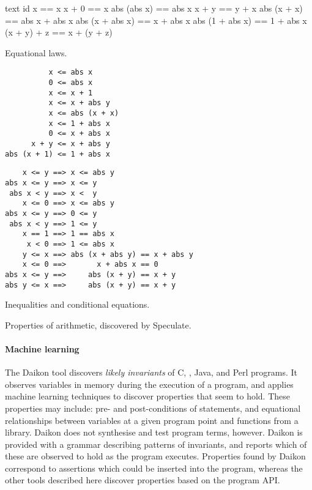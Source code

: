 \begin{listing}
\begin{sublisting}{\textwidth}
\centering
\begin{cminted}{text}
           id x == x
          x + 0 == x
    abs (abs x) == abs x
          x + y == y + x
    abs (x + x) == abs x + abs x
abs (x + abs x) == x + abs x
abs (1 + abs x) == 1 + abs x
    (x + y) + z == x + (y + z)
\end{cminted}
\caption{Equational laws.}\label{lst:arith_props0}
\end{sublisting}

\vspace{1.5em}

\begin{sublisting}{\textwidth}
\begin{minipage}[t]{0.45\textwidth}
\begin{verbatim}
          x <= abs x
          0 <= abs x
          x <= x + 1
          x <= x + abs y
          x <= abs (x + x)
          x <= 1 + abs x
          0 <= x + abs x
      x + y <= x + abs y
abs (x + 1) <= 1 + abs x
\end{verbatim}
\end{minipage}
\begin{minipage}[t]{0.55\textwidth}
\begin{verbatim}
    x <= y ==> x <= abs y
abs x <= y ==> x <= y
 abs x < y ==> x <  y
    x <= 0 ==> x <= abs y
abs x <= y ==> 0 <= y
 abs x < y ==> 1 <= y
    x == 1 ==> 1 == abs x
     x < 0 ==> 1 <= abs x
    y <= x ==> abs (x + abs y) == x + abs y
    x <= 0 ==>       x + abs x == 0
abs x <= y ==>     abs (x + y) == x + y
abs y <= x ==>     abs (x + y) == x + y
\end{verbatim}
\end{minipage}
\caption{Inequalities and conditional equations.}\label{lst:arith_props1}
\end{sublisting}
\caption{Properties of arithmetic, discovered by Speculate.}\label{lst:arith_props}
\end{listing}

\paragraph{Machine learning}
The Daikon \parencite{ernst2007} tool discovers \emph{likely invariants} of
C, \CPP{}, Java, and Perl programs.  It observes variables in memory
during the execution of a program, and applies machine learning
techniques to discover properties that seem to hold.  These properties
may include: pre- and post-conditions of statements, and equational
relationships between variables at a given program point and functions
from a library.  Daikon does not synthesise and test program terms,
however.  Daikon is provided with a grammar describing patterns of
invariants, and reports which of these are observed to hold as the
program executes.  Properties found by Daikon correspond to assertions
which could be inserted into the program, whereas the other tools
described here discover properties based on the program API.

